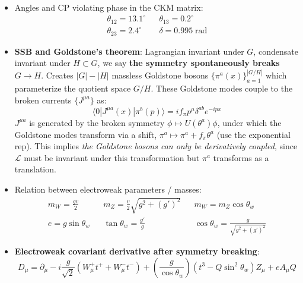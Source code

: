 \documentclass[11pt, oneside]{article}   	%
\theoremstyle{definition}
\numberwithin{equation}{subsection}		%
\begin{document}
\begin{itemize}
	\item Angles and CP violating phase in the CKM matrix:
	\begin{align}
		\theta_{12} = 13.1^\circ && \theta_{13} = 0.2^\circ \\
		\theta_{23} = 2.4^\circ && \delta = 0.995 \;\mathrm{rad}
	\end{align}
	
	\item \textbf{SSB and Goldstone's theorem}: Lagrangian invariant under $G$, condensate invariant under $H\subset G$, we say 
	\textbf{the symmetry spontaneously breaks $G\rightarrow H$}. Creates $|G| - |H|$ massless Goldstone bosons $\{\pi^a(x)\}_{a = 1}^{|G / H|}$ 
	which parameterize the quotient space $G / H$. These Goldstone modes couple to the broken currents $\{J^{\mu a}\}$ as:
	\begin{equation}
		\langle 0 | J^{\mu a}(x) | \pi^b(p)\rangle = i f_\pi p^\mu \delta^{ab} e^{-ipx}
	\end{equation}
	$J^{\mu a}$ is generated by the broken symmetry $\phi\mapsto U(\theta^a)\phi$, under which the Goldstone modes transform 
	via a shift, $\pi^a\mapsto \pi^a + f_\pi\theta^a$ (use the exponential rep). This implies \textit{the Goldstone bosons can only be 
	derivatively coupled}, since $\mathcal L$ must be invariant under this transformation but $\pi^a$ transforms as a translation.
	
	\item Relation between electroweak parameters / masses:
	\begin{align}
		m_W = \frac{gv}{2} && m_Z = \frac{v}{2}\sqrt{g^2 + (g')^2} && m_W = m_Z\cos\theta_w \\
		e = g\sin\theta_w && \tan\theta_w = \frac{g'}{g} && \cos\theta_w = \frac{g}{\sqrt{g^2 + (g')^2}}
	\end{align}
	
	\item \textbf{Electroweak covariant derivative after symmetry breaking}:
	\begin{equation}
		D_\mu = \partial_\mu -i \frac{g}{\sqrt 2} (W_\mu^+ t^+ + W_\mu^- t^-) + \left(\frac{g}{\cos\theta_w}\right) (t^3 - 
		Q\sin^2\theta_w) Z_\mu + e A_\mu Q
	\end{equation}
	

\end{itemize}
\end{document}
